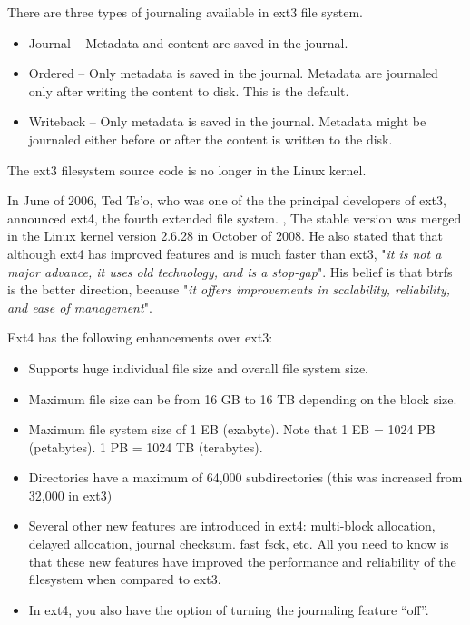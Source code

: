 \noindent
There are three types of journaling available in ext3 file system.

\begin{itemize}
	\item Journal -- Metadata and content are saved in the journal.
	\item Ordered -- Only metadata is saved in the journal. Metadata are journaled only after writing the 
		content to disk. This is the default.
	\item Writeback -- Only metadata is saved in the journal. Metadata might be journaled either before or after 
		the content is written to the disk.
\end{itemize}

\noindent
The ext3 filesystem source code is no longer in the Linux kernel.

In June of 2006, Ted Ts'o, who was one of the the principal developers of ext3, announced ext4, the fourth extended file system. , The stable version was merged in the Linux kernel version 2.6.28 in October of 2008. He also stated that that although ext4 has improved features and is much faster than ext3, "\textit{it is not a major advance, it uses old technology, and is a stop-gap}". His belief is that btrfs is the better direction, because "\textit{it offers improvements in scalability, reliability, and ease of management}".

Ext4 has the following enhancements over ext3:

\begin{itemize}
	\item Supports huge individual file size and overall file system size.
	\item Maximum file size can be from 16 GB to 16 TB depending on the block size.
	\item Maximum file system size of 1 EB (exabyte). Note that 1 EB = 1024 PB (petabytes). 1 PB = 1024 TB (terabytes).
	\item Directories have a maximum of 64,000 subdirectories (this was increased from 32,000 in ext3)
	\item Several other new features are introduced in ext4: multi-block allocation, delayed allocation, 
		journal checksum. fast fsck, etc. All you need to know is that these new features have improved the 
		performance and reliability of the filesystem when compared to ext3.
	\item In ext4, you also have the option of turning the journaling feature “off”.
\end{itemize}

